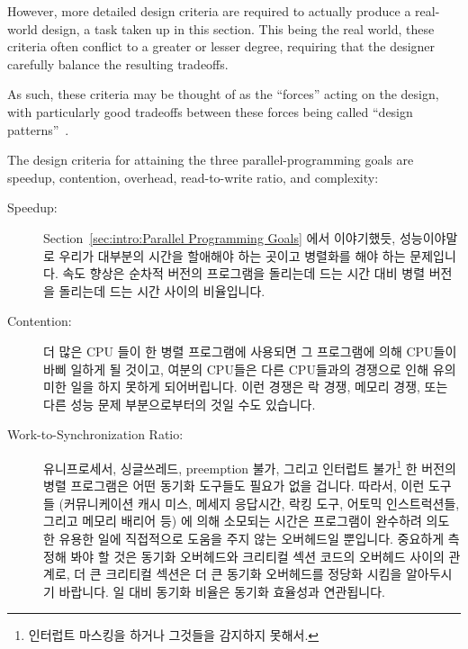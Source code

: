 However, more detailed design criteria are required to
actually produce a real-world design, a task taken up in this section.
This being the real world, these criteria often conflict to a
greater or lesser degree, requiring that the designer carefully
balance the resulting tradeoffs.

As such, these criteria may be thought of as the ``forces''
acting on the design, with particularly good tradeoffs between
these forces being called ``design patterns''~\cite{Alexander79,GOF95}.

The design criteria for attaining the three parallel-programming goals
are speedup,
contention, overhead, read-to-write ratio, and complexity:
\fi
\begin{description}
\item[Speedup:]  Section~\ref{sec:intro:Parallel Programming Goals} 에서
	이야기했듯, 성능이야말로 우리가 대부분의 시간을 할애해야 하는 곳이고
	병렬화를 해야 하는 문제입니다.
	속도 향상은 순차적 버전의 프로그램을 돌리는데 드는 시간 대비 병렬
	버전을 돌리는데 드는 시간 사이의 비율입니다.
\item[Contention:]  더 많은 CPU 들이 한 병렬 프로그램에 사용되면 그 프로그램에
	의해 CPU들이 바삐 일하게 될 것이고, 여분의 CPU들은 다른 CPU들과의
	경쟁으로 인해 유의미한 일을 하지 못하게 되어버립니다.
	이런 경쟁은 락 경쟁, 메모리 경쟁, 또는 다른 성능 문제 부분으로부터의
	것일 수도 있습니다.
\iffalse

\item[Speedup:]  As noted in
	Section~\ref{sec:intro:Parallel Programming Goals},
	increased performance is the major reason
	to go to all of the time and trouble
	required to parallelize it.
	Speedup is defined to be the ratio of the time required
	to run a sequential version of the program to the time
	required to run a parallel version.
\item[Contention:]  If more CPUs are applied to a parallel
	program than can be kept busy by that program,
	the excess CPUs are prevented from doing
	useful work by contention.
	This may be lock contention, memory contention, or a host
	of other performance killers.
\fi
\item[Work-to-Synchronization Ratio:]  유니프로세서, 싱글쓰레드, preemption
	불가, 그리고 인터럽트 불가\footnote{
		인터럽트 마스킹을 하거나 그것들을 감지하지 못해서.}
	한 버전의 병렬 프로그램은 어떤 동기화 도구들도 필요가 없을 겁니다.
	따라서, 이런 도구들 (커뮤니케이션 캐시 미스, 메세지 응답시간, 락킹
	도구, 어토믹 인스트럭션들, 그리고 메모리 배리어 등) 에 의해 소모되는
	시간은 프로그램이 완수하려 의도한 유용한 일에 직접적으로 도움을 주지
	않는 오버헤드일 뿐입니다.
	중요하게 측정해 봐야 할 것은 동기화 오버헤드와 크리티컬 섹션 코드의
	오버헤드 사이의 관계로, 더 큰 크리티컬 섹션은 더 큰 동기화 오버헤드를
	정당화 시킴을 알아두시기 바랍니다.
	일 대비 동기화 비율은 동기화 효율성과 연관됩니다.
\iffalse


\end{description}
